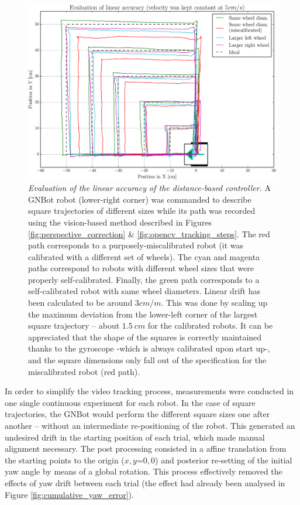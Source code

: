 \documentclass[12pt,twoside]{report}
\begin{document}
\begin{figure}[hbtp]
\centerline{\includegraphics[width=1\linewidth]{square_distance_comparison}}
\caption[Evaluation of the linear accuracy of the distance-based controller]{\emph{Evaluation of the linear accuracy of the distance-based controller.}
A GNBot robot (lower-right corner) was commanded to describe square trajectories of different sizes while its path was recorded using the vision-based method described in Figures \ref{fig:perspective_correction} \& \ref{fig:opencv_tracking_steps}.
The red path corresponds to a purposely-miscalibrated robot (it was calibrated with a different set of wheels).
The cyan and magenta paths correspond to robots with different wheel sizes that were properly self-calibrated.
Finally, the green path corresponds to a self-calibrated robot with same wheel diameters.
Linear drift has been calculated to be around $3cm/m$. This was done by scaling up the maximum deviation from the lower-left corner of the largest square trajectory -- about $1.5\ cm$ for the calibrated robots.
It can be appreciated that the shape of the squares is correctly maintained thanks to the gyroscope -which is always calibrated upon start up-, and the square dimensions only fall out of the specification for the miscalibrated robot (red path).
}
\label{fig:square_distance_comparison}
\end{figure}


In order to simplify the video tracking process, measurements were conducted in one single continuous experiment for each robot. In the case of square trajectories, the GNBot would perform the different square sizes one after another -- without an intermediate re-positioning of the robot.
This generated an undesired drift in the starting position of each trial, which made manual alignment necessary.
The post processing consisted in a affine translation from the starting points to the origin ($x,y$=$0,0$) and posterior re-setting of the initial yaw angle by means of a global rotation.
This process effectively removed the effects of yaw drift between each trial (the effect had already been analysed in Figure \ref{fig:cumulative_yaw_error}).
\end{document}
